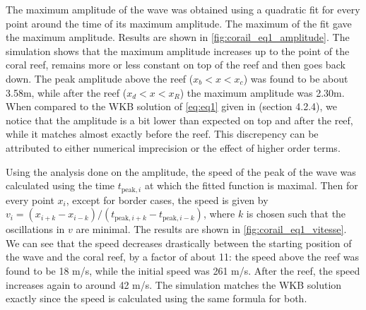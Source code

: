 The maximum amplitude of the wave was obtained using a quadratic fit for every point around the time of its maximum amplitude. The maximum of the fit gave the maximum amplitude. Results are shown in \autoref{fig:corail_eq1_amplitude}. The simulation shows that the maximum amplitude increases up to the point of the coral reef, remains more or less constant on top of the reef and then goes back down. The peak amplitude above the reef (\(x_b < x < x_c\)) was found to be about 3.58m, while after the reef (\(x_d<x<x_R\)) the maximum amplitude was 2.30m. When compared to the WKB solution of \autoref{eq:eq1} given in \cite{physnumbook} (section 4.2.4), we notice that the amplitude is a bit lower than expected on top and after the reef, while it matches almost exactly before the reef. This discrepency can be attributed to either numerical imprecision or the effect of higher order terms.

Using the analysis done on the amplitude, the speed of the peak of the wave was calculated using the time \(t_{\textrm{peak},i}\) at which the fitted function is maximal. Then for every point \(x_i\), except for border cases, the speed is given by \(v_i = (x_{i+k} - x_{i-k})/(t_{\textrm{peak},i+k} - t_{\textrm{peak},i-k})\), where \(k\) is chosen such that the oscillations in \(v\) are minimal. The results are shown in \autoref{fig:corail_eq1_vitesse}. We can see that the speed decreases drastically between the starting position of the wave and the coral reef, by a factor of about 11: the speed above the reef was found to be 18 m/s, while the initial speed was 261 m/s. After the reef, the speed increases again to around 42 m/s. The simulation matches the WKB solution exactly since the speed is calculated using the same formula for both.

